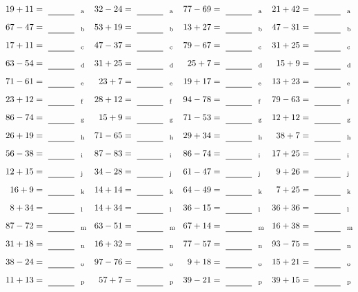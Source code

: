 \documentclass
[
  draft    = true,
  fontsize = 11pt,
  parskip  = half-
]
{scrartcl}
\begin{document}
\clearpage
\begin{align*}
    \pline{19+11}&=\rline{a}
  & \pline{32-24}&=\rline{a}
  & \pline{77-69}&=\rline{a}
  & \pline{21+42}&=\rline{a} \\[1ex]
    \pline{67-47}&=\rline{b}
  & \pline{53+19}&=\rline{b}
  & \pline{13+27}&=\rline{b}
  & \pline{47-31}&=\rline{b} \\[1ex]
    \pline{17+11}&=\rline{c}
  & \pline{47-37}&=\rline{c}
  & \pline{79-67}&=\rline{c}
  & \pline{31+25}&=\rline{c} \\[1ex]
    \pline{63-54}&=\rline{d}
  & \pline{31+25}&=\rline{d}
  & \pline{25+7}&=\rline{d}
  & \pline{15+9}&=\rline{d} \\[1ex]
    \pline{71-61}&=\rline{e}
  & \pline{23+7}&=\rline{e}
  & \pline{19+17}&=\rline{e}
  & \pline{13+23}&=\rline{e} \\[1ex]
    \pline{23+12}&=\rline{f}
  & \pline{28+12}&=\rline{f}
  & \pline{94-78}&=\rline{f}
  & \pline{79-63}&=\rline{f} \\[1ex]
    \pline{86-74}&=\rline{g}
  & \pline{15+9}&=\rline{g}
  & \pline{71-53}&=\rline{g}
  & \pline{12+12}&=\rline{g} \\[1ex]
    \pline{26+19}&=\rline{h}
  & \pline{71-65}&=\rline{h}
  & \pline{29+34}&=\rline{h}
  & \pline{38+7}&=\rline{h} \\[1ex]
    \pline{56-38}&=\rline{i}
  & \pline{87-83}&=\rline{i}
  & \pline{86-74}&=\rline{i}
  & \pline{17+25}&=\rline{i} \\[1ex]
    \pline{12+15}&=\rline{j}
  & \pline{34-28}&=\rline{j}
  & \pline{61-47}&=\rline{j}
  & \pline{9+26}&=\rline{j} \\[1ex]
    \pline{16+9}&=\rline{k}
  & \pline{14+14}&=\rline{k}
  & \pline{64-49}&=\rline{k}
  & \pline{7+25}&=\rline{k} \\[1ex]
    \pline{8+34}&=\rline{l}
  & \pline{14+34}&=\rline{l}
  & \pline{36-15}&=\rline{l}
  & \pline{36+36}&=\rline{l} \\[1ex]
    \pline{87-72}&=\rline{m}
  & \pline{63-51}&=\rline{m}
  & \pline{67+14}&=\rline{m}
  & \pline{16+38}&=\rline{m} \\[1ex]
    \pline{31+18}&=\rline{n}
  & \pline{16+32}&=\rline{n}
  & \pline{77-57}&=\rline{n}
  & \pline{93-75}&=\rline{n} \\[1ex]
    \pline{38-24}&=\rline{o}
  & \pline{97-76}&=\rline{o}
  & \pline{9+18}&=\rline{o}
  & \pline{15+21}&=\rline{o} \\[1ex]
    \pline{11+13}&=\rline{p}
  & \pline{57+7}&=\rline{p}
  & \pline{39-21}&=\rline{p}
  & \pline{39+15}&=\rline{p}
\end{align*}
\end{document}
